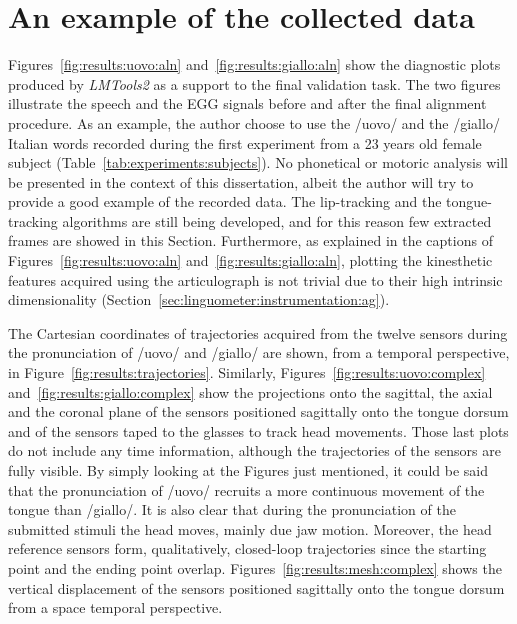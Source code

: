 \section{An example of the collected data}
Figures~\ref{fig:results:uovo:aln} and~\ref{fig:results:giallo:aln} show the
diagnostic plots produced by \emph{LMTools2} as a support to the final
validation task.
The two figures illustrate the speech and the EGG signals before and after the
final alignment procedure. As an example, the author choose to use the /uovo/
and the /giallo/ Italian words recorded during the first experiment from a 23
years old female subject (Table~\ref{tab:experiments:subjects}).
No phonetical or motoric analysis will be presented in the context
of this dissertation, albeit the author will try to provide a good example 
of the recorded data.
The lip-tracking and the tongue-tracking algorithms are still being developed,
and for this reason few extracted frames are showed in this Section.
Furthermore, as explained in the captions of Figures~\ref{fig:results:uovo:aln}
and~\ref{fig:results:giallo:aln}, plotting the kinesthetic features acquired
using the articulograph is not trivial due to their high intrinsic 
dimensionality (Section~\ref{sec:linguometer:instrumentation:ag}).




The Cartesian coordinates of trajectories acquired from the twelve sensors 
during the pronunciation of /uovo/ and /giallo/ are shown, from a temporal
perspective, in Figure~\ref{fig:results:trajectories}.
Similarly, Figures~\ref{fig:results:uovo:complex}
and~\ref{fig:results:giallo:complex} show the projections onto the sagittal, 
the axial and the coronal plane of the sensors positioned sagittally onto the 
tongue dorsum and of the sensors taped to the glasses to track head movements.
Those last plots do not include any time information, although the
trajectories of the sensors are fully visible.
By simply looking at the Figures just mentioned, it could be said that the
pronunciation of /uovo/ recruits a more continuous movement of the tongue than
/giallo/. 
It is also clear that during the pronunciation of the submitted stimuli the head
moves, mainly due jaw motion. 
Moreover, the head reference sensors form, qualitatively, closed-loop
trajectories since the starting point and the ending point overlap. 
Figures~\ref{fig:results:mesh:complex} shows the vertical displacement of the
sensors positioned sagittally onto the tongue dorsum from a space temporal 
perspective.

